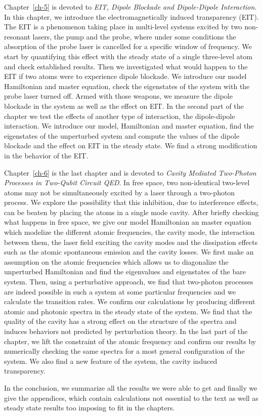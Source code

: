 Chapter~\ref{ch-5} is devoted to \textit{EIT, Dipole Blockade and Dipole-Dipole Interaction}. In this chapter, we introduce the electromagnetically induced transparency (EIT). The EIT is a phenomenon taking place in multi-level systems excited by two non-resonant lasers, the pump and the probe, where under some conditions the absorption of the probe laser is cancelled for a specific window of frequency. We start by quantifying this effect with the steady state of a single three-level atom and check established results. Then we investigated what would happen to the EIT if two atoms were to experience dipole blockade. We introduce our model Hamiltonian and master equation, check the eigenstates of the system with the probe laser turned off. Armed with those weapons, we measure the dipole blockade in the system as well as the effect on EIT. In the second part of the chapter we test the effects of another type of interaction, the dipole-dipole interaction. We introduce our model, Hamiltonian and master equation, find the eigenstates of the unperturbed system and compute the values of the dipole blockade and the effect on EIT in the steady state. We find a strong modification in the behavior of the EIT.

Chapter~\ref{ch-6} is the last chapter and is devoted to \textit{Cavity Mediated Two-Photon Processes in Two-Qubit Circuit QED}. In free space, two non-identical two-level atoms may not be simultaneously excited by a laser through a two-photon process. We explore the possibility that this inhibition, due to interference effects, can be beaten by placing the atoms in a single mode cavity. After briefly checking what happens in free space, we give our model Hamiltonian an master equation which modelize the different atomic frequencies, the cavity mode, the interaction between them, the laser field exciting the cavity modes and the dissipation effects such as the atomic spontaneous emission and the cavity losses. We first make an assumption on the atomic frequencies which allows us to diagonalize the unperturbed Hamiltonian and find the eigenvalues and eigenstates of the bare system. Then, using a perturbative approach, we find that  two-photon processes are indeed possible in such a system at some particular frequencies and we calculate the transition rates. We confirm our calculations by producing different atomic and photonic spectra in the steady state of the system. We find that the quality of the cavity has a strong effect on the structure of the spectra and induces behaviors not predicted by perturbation theory. In the last part of the chapter, we lift the constraint of the atomic frequency and confirm our results by numerically checking the same spectra for a most general configuration of the system. We also find a new feature of the system, the cavity induced transparency.

In the conclusion, we summarize all the results we were able to get and finally we give the appendices, which contain calculations not essential to the text as well as steady state results too imposing to fit in the chapters.
